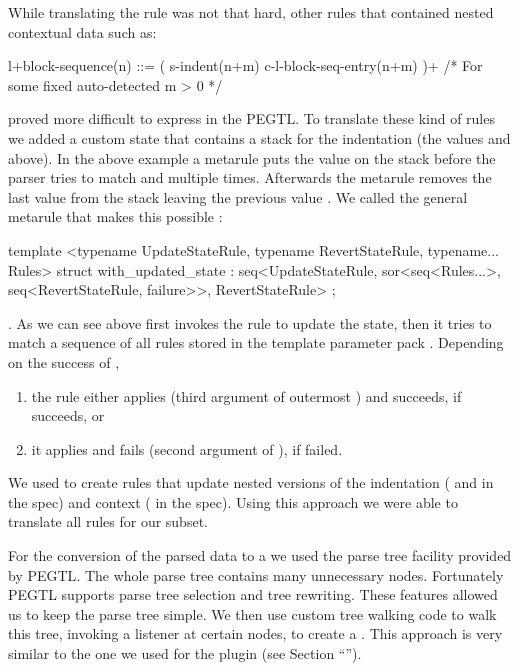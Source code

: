While translating the rule  was not that hard, other rules that contained nested contextual data such as:

\begin{ccode}
l+block-sequence(n) ::= ( s-indent(n+m) c-l-block-seq-entry(n+m) )+
                        /* For some fixed auto-detected m > 0 */
\end{ccode}

proved more difficult to express in the \gls{PEGTL}. To translate these kind of rules we added a custom state that contains a stack for the indentation (the values  and  above). In the above example a metarule puts the value  on the stack before the parser tries to match  and  multiple times. Afterwards the metarule removes the last value from the stack leaving the previous value . We called the general metarule that makes this possible :

\begin{cppcode}
  template <typename UpdateStateRule,
            typename RevertStateRule,
            typename... Rules>
  struct with_updated_state :
  seq<UpdateStateRule,
      sor<seq<Rules...>,
          seq<RevertStateRule, failure>>,
      RevertStateRule> {};
\end{cppcode}

. As we can see above  first invokes the rule  to update the state, then it tries to match a sequence of all rules stored in the template parameter pack . Depending on the success of ,

\begin{enumerate}
  \item the rule  either applies  (third argument of outermost ) and succeeds, if  succeeds, or
  \item it applies  and fails (second argument of ), if  failed.
\end{enumerate}

We used  to create rules that update nested versions of the indentation ( and  in the  spec) and context ( in the  spec). Using this approach we were able to translate all  rules for our subset.

For the conversion of the parsed data to a  we used the parse tree facility provided by \gls{PEGTL}. The whole parse tree contains many unnecessary nodes. Fortunately \gls{PEGTL} supports parse tree selection and tree rewriting. These features allowed us to keep the parse tree simple. We then use custom tree walking code to walk this tree, invoking a listener at certain nodes, to create a . This approach is very similar to the one we used for the \LinkYAwn{} plugin (see Section “”).

